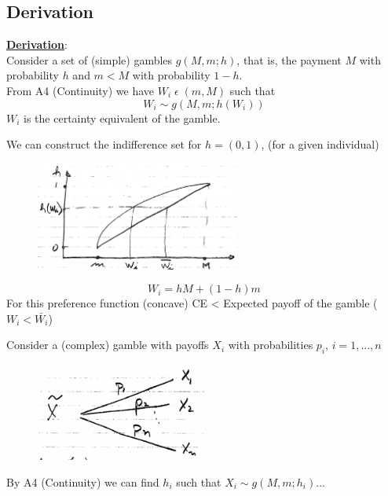 \documentclass[
14pt,notheorems,hyperref={pdfauthor=whatever}
]{beamer}
\begin{document}
\subsection{Derivation}

\begin{frame}
\underline{\textbf{Derivation}}:\\
\hfill \break
Consider a set of (simple) gambles $g(M,m;h)$, that is, the payment $M$ with probability $h$ and $m<M$ with probability $1-h$.\\
From A4 (Continuity) we have $W_i\;\epsilon\;(m,M)$ such that\\
\[W_i \sim g(M,m;h(W_i))\]
\hfill \break
$W_i$ is the certainty equivalent of the gamble.
\end{frame}

\begin{frame}
We can construct the indifference set for $h=(0,1)$, (for a given individual)\\
\begin{figure}[indiff-set]
    \includegraphics[width=0.6\textwidth]{L2-indiffset}
    \centering
\end{figure}
\[W_i = hM+(1-h)m\]
For this preference function (concave) CE < Expected payoff of the gamble ($W_i<\bar{W_i}$)
\end{frame}

\begin{frame}
Consider a (complex) gamble with payoffs $X_i$ with probabilities $p_i$, $i=1,...,n$\\
\begin{figure}[complex-gamble]
    \includegraphics[width=0.5\textwidth]{L2-complex-gamble}
    \centering
\end{figure}
By A4 (Continuity) we can find $h_i$ such that $X_i \sim g(M,m;h_i)$...
\end{frame}
\end{document}
